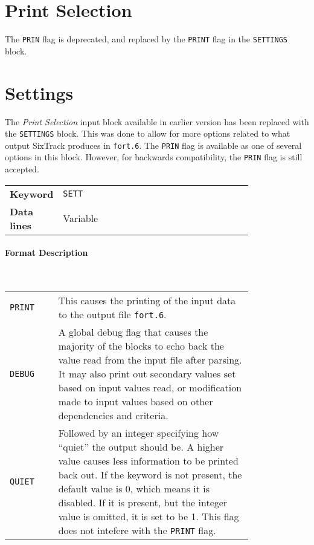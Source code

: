 \section{Print Selection} \label{PriSel}

The \texttt{PRIN} flag is deprecated, and replaced by the \texttt{PRINT} flag in the \texttt{SETTINGS} block.

\section{Settings} \label{STSett}

The \textit{Print Selection} input block available in earlier version has been replaced with the \texttt{SETTINGS} block.
This was done to allow for more options related to what output SixTrack produces in \texttt{fort.6}.
The \texttt{PRIN} flag is available as one of several options in this block.
However, for backwards compatibility, the \texttt{PRIN} flag is still accepted.

\bigskip
\begin{tabular}{@{}lp{0.8\linewidth}}
    \textbf{Keyword}    & \texttt{SETT} \\
    \textbf{Data lines} & Variable
\end{tabular}

\paragraph{Format Description}~

\bigskip
\begin{tabular}{@{}lp{0.8\linewidth}}
    \texttt{PRINT} & This causes the printing of the input data to the output file \texttt{fort.6}. \\
    \texttt{DEBUG} & A global debug flag that causes the majority of the blocks to echo back the value read from the input file after parsing. It may also print out secondary values set based on input values read, or modification made to input values based on other dependencies and criteria.\\
    \texttt{QUIET} & Followed by an integer specifying how ``quiet'' the output should be. A higher value causes less information to be printed back out. If the keyword is not present, the default value is 0, which means it is disabled. If it is present, but the integer value is omitted, it is set to be 1. This flag does not intefere with the \texttt{PRINT} flag.
\end{tabular}


